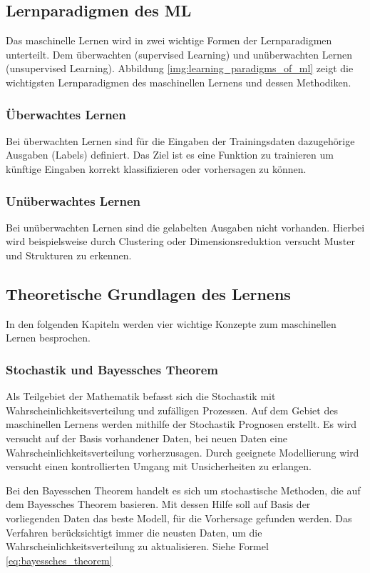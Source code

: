 \subsection{Lernparadigmen des ML}
Das maschinelle Lernen wird in zwei wichtige Formen der Lernparadigmen unterteilt. Dem überwachten (supervised Learning) und unüberwachten Lernen (unsupervised Learning). Abbildung \ref{img:learning_paradigms_of_ml} zeigt die wichtigsten Lernparadigmen des maschinellen Lernens und dessen Methodiken.

\subsubsection{Überwachtes Lernen}
Bei überwachten Lernen sind für die Eingaben der Trainingsdaten dazugehörige Ausgaben (Labels) definiert. Das Ziel ist es eine Funktion zu trainieren um künftige Eingaben korrekt klassifizieren oder vorhersagen zu können.

\subsubsection{Unüberwachtes Lernen}
Bei unüberwachten Lernen sind die gelabelten Ausgaben nicht vorhanden. Hierbei wird beispielsweise durch Clustering oder Dimensionsreduktion versucht Muster und Strukturen zu erkennen.


\subsection{Theoretische Grundlagen des Lernens}
In den folgenden Kapiteln werden vier wichtige Konzepte zum maschinellen Lernen besprochen. 

\subsubsection{Stochastik und Bayessches Theorem}
Als Teilgebiet der Mathematik befasst sich die Stochastik mit Wahrscheinlichkeitsverteilung und zufälligen Prozessen. Auf dem Gebiet des maschinellen Lernens werden mithilfe der Stochastik Prognosen erstellt. Es wird versucht auf der Basis vorhandener Daten, bei neuen Daten eine Wahrscheinlichkeitsverteilung vorherzusagen. Durch geeignete Modellierung wird versucht einen kontrollierten Umgang mit Unsicherheiten zu erlangen.\vspace{0.2cm}

Bei den Bayesschen Theorem handelt es sich um stochastische Methoden, die auf dem Bayessches Theorem basieren. Mit dessen Hilfe soll auf Basis der vorliegenden Daten das beste Modell, für die Vorhersage gefunden werden. Das Verfahren berücksichtigt immer die neusten Daten, um die Wahrscheinlichkeitsverteilung zu aktualisieren. Siehe Formel \ref{eq:bayessches_theorem}

